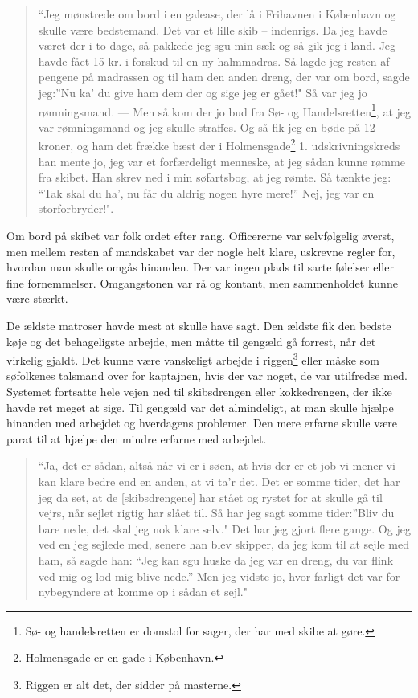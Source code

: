 \begin{quote}
``Jeg mønstrede om bord i en galease, der lå i Frihavnen i København og
skulle være bedstemand. Det var et lille skib -- indenrigs. Da jeg havde
været der i to dage, så pakkede jeg sgu min sæk og så gik jeg i land.
Jeg havde fået 15 kr. i forskud til en ny halmmadras. Så lagde jeg
resten af pengene på madrassen og til ham den anden dreng, der var om
bord, sagde jeg:''Nu ka' du give ham dem der og sige jeg er gået!" Så
var jeg jo rømningsmand. --- Men så kom der jo bud fra Sø- og
Handelsretten\footnote{Sø- og handelsretten er domstol for sager, der
  har med skibe at gøre.}, at jeg var rømningsmand og jeg skulle
straffes. Og så fik jeg en bøde på 12 kroner, og ham det frække bæst der
i Holmensgade\footnote{Holmensgade er en gade i København.} 1.
udskrivningskreds han mente jo, jeg var et forfærdeligt menneske, at jeg
sådan kunne rømme fra skibet. Han skrev ned i min søfartsbog, at jeg
rømte. Så tænkte jeg: ``Tak skal du ha', nu får du aldrig nogen hyre
mere!'' Nej, jeg var en storforbryder!".
\end{quote}

Om bord på skibet var folk ordet efter rang. Officererne var
selvfølgelig øverst, men mellem resten af mandskabet var der nogle helt
klare, uskrevne regler for, hvordan man skulle omgås hinanden. Der var
ingen plads til sarte følelser eller fine fornemmelser. Omgangstonen var
rå og kontant, men sammenholdet kunne være stærkt.

De ældste matroser havde mest at skulle have sagt. Den ældste fik den
bedste køje og det behageligste arbejde, men måtte til gengæld gå
forrest, når det virkelig gjaldt. Det kunne være vanskeligt arbejde i
riggen\footnote{Riggen er alt det, der sidder på masterne.} eller måske
som søfolkenes talsmand over for kaptajnen, hvis der var noget, de var
utilfredse med. Systemet fortsatte hele vejen ned til skibsdrengen eller
kokkedrengen, der ikke havde ret meget at sige. Til gengæld var det
almindeligt, at man skulle hjælpe hinanden med arbejdet og hverdagens
problemer. Den mere erfarne skulle være parat til at hjælpe den mindre
erfarne med arbejdet.

\begin{quote}
``Ja, det er sådan, altså når vi er i søen, at hvis der er et job vi
mener vi kan klare bedre end en anden, at vi ta'r det. Det er somme
tider, det har jeg da set, at de {[}skibsdrengene{]} har stået og rystet
for at skulle gå til vejrs, når sejlet rigtig har slået til. Så har jeg
sagt somme tider:''Bliv du bare nede, det skal jeg nok klare selv." Det
har jeg gjort flere gange. Og jeg ved en jeg sejlede med, senere han
blev skipper, da jeg kom til at sejle med ham, så sagde han: ``Jeg kan
sgu huske da jeg var en dreng, du var flink ved mig og lod mig blive
nede.'' Men jeg vidste jo, hvor farligt det var for nybegyndere at komme
op i sådan et sejl."
\end{quote}

